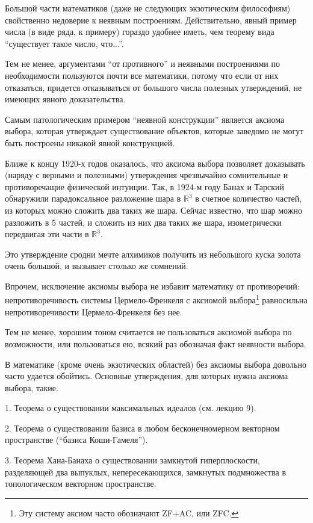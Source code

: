 \documentclass[12pt]{book}
\def\R{{\mathbb R}}
\theoremstyle{upshape}
\theoremstyle{generic}
\theoremstyle{upshapenonumber}
\newcommand{\следствие}{%
     \refstepcounter{teorema}
     {\noindent\bf Следствие \thechapter.\arabic{teorema}:\ }}
\newcommand{\пример}{%
     \refstepcounter{teorema}
     {\noindent\bf Пример \thechapter.\arabic{teorema}:\ }}
\newcommand{\лемма}{%
     \refstepcounter{teorema}
     {\noindent\bf Лемма \thechapter.\arabic{teorema}:\ }}
\newcommand{\теорема}{%
     \refstepcounter{teorema}
     {\noindent\bf Теорема \thechapter.\arabic{teorema}:\ }}
\newcommand{\утверждение}{%
     \refstepcounter{teorema}
     {\noindent\bf Утверждение \thechapter.\arabic{teorema}:\ }}
\begin{document}

Большой части математиков (даже не следующих
экзотическим философиям) свойственно недоверие
к неявным построениям. Действительно, явный
пример числа (в виде ряда, к примеру)
гораздо удобнее иметь, чем теорему вида
``существует такое число, что...''.

Тем не менее, аргументами ``от противного''
и неявными построениями по необходимости 
пользуются почти все математики, потому что 
если от них отказаться, придется отказываться
от большого числа полезных утверждений,
не имеющих явного доказательства.

Самым патологическим примером ``неявной
конструкции'' является аксиома выбора,
которая утверждает существование объектов,
которые заведомо не могут быть построены
никакой явной конструкцией.

Ближе к концу 1920-х годов
оказалось, что аксиома выбора позволяет доказывать
(наряду с верными и полезными) утверждения
чрезвычайно сомнительные и противоречащие
физической интуиции. Так, в 1924-м 
году Банах и Тарский обнаружили парадоксальное
разложение шара в $\R^3$ в счетное количество
частей, из которых можно сложить два таких
же шара. Сейчас известно, что шар можно
разложить в 5 частей, и сложить из них два таких
же шара, изометрически передвигая эти части в  $\R^3$.

Это утверждение сродни мечте алхимиков получить
из небольшого куска золота очень большой, и 
вызывает столько же сомнений.

Впрочем, исключение аксиомы выбора не избавит
математику от противоречий: непротиворечивость
системы Цермело-Френкеля с аксиомой выбора\footnote{Эту систему
аксиом часто обозначают ZF+AC, или ZFC.} равносильна непротиворечивости
Цермело-Френкеля без нее.

Тем не менее, хорошим тоном считается
не пользоваться аксиомой выбора по возможности,
или пользоваться ею, всякий раз обозначая
факт неявности выбора.

В математике (кроме очень экзотических областей)
без аксиомы выбора довольно часто удается
обойтись. Основные утверждения, для которых
нужна аксиома выбора, такие.

1. Теорема о существовании максимальных идеалов
(см. лекцию 9).

2. Теорема о существовании базиса в любом бесконечномерном
векторном пространстве (``базиса Коши-Гамеля'').

3. Теорема Хана-Банаха о существовании замкнутой 
гиперплоскости, разделяющей два выпуклых, непересекающихся, замкнутых
подмножества в топологическом векторном пространстве.
\end{document}
